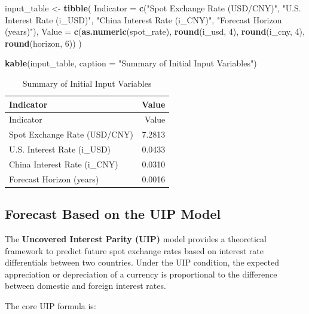 \documentclass[
]{article}
\newenvironment{Shaded}{\begin{snugshade}}{\end{snugshade}}
\newcommand{\AttributeTok}[1]{\textcolor[rgb]{0.13,0.29,0.53}{#1}}
\newcommand{\DecValTok}[1]{\textcolor[rgb]{0.00,0.00,0.81}{#1}}
\newcommand{\FunctionTok}[1]{\textcolor[rgb]{0.13,0.29,0.53}{\textbf{#1}}}
\newcommand{\NormalTok}[1]{#1}
\newcommand{\OtherTok}[1]{\textcolor[rgb]{0.56,0.35,0.01}{#1}}
\newcommand{\StringTok}[1]{\textcolor[rgb]{0.31,0.60,0.02}{#1}}
\begin{document}
\begin{Shaded}
\begin{Highlighting}[]
\NormalTok{input\_table }\OtherTok{\textless{}{-}} \FunctionTok{tibble}\NormalTok{(}
  \AttributeTok{Indicator =} \FunctionTok{c}\NormalTok{(}\StringTok{"Spot Exchange Rate (USD/CNY)"}\NormalTok{, }
                \StringTok{"U.S. Interest Rate (i\_USD)"}\NormalTok{, }
                \StringTok{"China Interest Rate (i\_CNY)"}\NormalTok{, }
                \StringTok{"Forecast Horizon (years)"}\NormalTok{),}
  \AttributeTok{Value =} \FunctionTok{c}\NormalTok{(}\FunctionTok{as.numeric}\NormalTok{(spot\_rate),}
            \FunctionTok{round}\NormalTok{(i\_usd, }\DecValTok{4}\NormalTok{),}
            \FunctionTok{round}\NormalTok{(i\_cny, }\DecValTok{4}\NormalTok{),}
            \FunctionTok{round}\NormalTok{(horizon, }\DecValTok{6}\NormalTok{))}
\NormalTok{)}

\FunctionTok{kable}\NormalTok{(input\_table, }\AttributeTok{caption =} \StringTok{"Summary of Initial Input Variables"}\NormalTok{)}
\end{Highlighting}
\end{Shaded}

\begin{longtable}[]{@{}lr@{}}
\caption{Summary of Initial Input Variables}\tabularnewline
\toprule\noalign{}
Indicator & Value \\
\midrule\noalign{}
\endfirsthead
\toprule\noalign{}
Indicator & Value \\
\midrule\noalign{}
\endhead
\bottomrule\noalign{}
\endlastfoot
Spot Exchange Rate (USD/CNY) & 7.2813 \\
U.S. Interest Rate (i\_USD) & 0.0433 \\
China Interest Rate (i\_CNY) & 0.0310 \\
Forecast Horizon (years) & 0.0016 \\
\end{longtable}

\subsection{Forecast Based on the UIP
Model}\label{forecast-based-on-the-uip-model}

The \textbf{Uncovered Interest Parity (UIP)} model provides a
theoretical framework to predict future spot exchange rates based on
interest rate differentials between two countries. Under the UIP
condition, the expected appreciation or depreciation of a currency is
proportional to the difference between domestic and foreign interest
rates.

The core UIP formula is:
\end{document}
